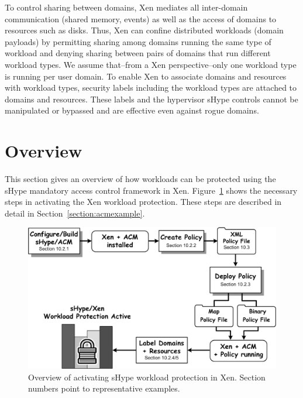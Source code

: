 \documentclass[11pt,twoside,final,openright]{report}
\begin{document}
To control sharing between domains, Xen mediates all inter-domain
communication (shared memory, events) as well as the access of domains
to resources such as disks. Thus, Xen can confine distributed
workloads (domain payloads) by permitting sharing among domains
running the same type of workload and denying sharing between pairs of
domains that run different workload types. We assume that--from a Xen
perspective--only one workload type is running per user domain. To
enable Xen to associate domains and resources with workload types,
security labels including the workload types are attached to domains
and resources. These labels and the hypervisor sHype controls cannot
be manipulated or bypassed and are effective even against rogue
domains.

\section{Overview}
This section gives an overview of how workloads can be protected using
the sHype mandatory access control framework in Xen.
Figure~\ref{fig:acmoverview} shows the necessary steps in activating
the Xen workload protection. These steps are described in detail in
Section~\ref{section:acmexample}.

\begin{figure}
\centering
\includegraphics[width=13cm]{figs/acm_overview.eps}
\caption{Overview of activating sHype workload protection in Xen.
  Section numbers point to representative examples.}
\label{fig:acmoverview}
\end{figure}
\end{document}
